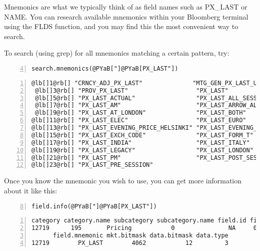 \documentclass[a4paper]{article}
\begin{document}
Mnemonics are what we typically think of as field names such as PX\_LAST or NAME. You can research available mnemonics within your Bloomberg terminal using the FLDS function, and you may find this the most convenient way to search.

To search (using grep) for all mnemonics matching a certain pattern, try:

\begin{Verbatim}[commandchars=@\[\],numbers=left,firstnumber=4,stepnumber=1]
search.mnemonics(@PYaB["]@PYaB[PX_LAST"])
\end{Verbatim}

    

\begin{Verbatim}[commandchars=@\[\],numbers=left,firstnumber=1,stepnumber=1]
 @lb[]1@rb[] "CRNCY_ADJ_PX_LAST"              "MTG_GEN_PX_LAST_UPDATE"        
 @lb[]3@rb[] "PROV_PX_LAST"                   "PX_LAST"                       
 @lb[]5@rb[] "PX_LAST_ACTUAL"                 "PX_LAST_ALL_SESSIONS"          
 @lb[]7@rb[] "PX_LAST_AM"                     "PX_LAST_ARROW_ALL_SESSION"     
 @lb[]9@rb[] "PX_LAST_AT_LONDON"              "PX_LAST_BOTH"                  
@lb[]11@rb[] "PX_LAST_ELEC"                   "PX_LAST_EURO"                  
@lb[]13@rb[] "PX_LAST_EVENING_PRICE_HELSINKI" "PX_LAST_EVENING_TRADE_HELSINKI"
@lb[]15@rb[] "PX_LAST_EXCH_CODE"              "PX_LAST_FORM_T"                
@lb[]17@rb[] "PX_LAST_INDIA"                  "PX_LAST_ITALY"                 
@lb[]19@rb[] "PX_LAST_LEGACY"                 "PX_LAST_LONDON"                
@lb[]21@rb[] "PX_LAST_PM"                     "PX_LAST_POST_SESSION"          
@lb[]23@rb[] "PX_LAST_PRE_SESSION"           
\end{Verbatim}

    

Once you know the mnemonic you wish to use, you can get more information about it like this:

\begin{Verbatim}[commandchars=@\[\],numbers=left,firstnumber=8,stepnumber=1]
field.info(@PYaB["]@PYaB[PX_LAST"])
\end{Verbatim}

    

\begin{Verbatim}[commandchars=@\[\],numbers=left,firstnumber=1,stepnumber=1]
      category category.name subcategory subcategory.name field.id field.name
12719      195       Pricing           0               NA     0560 Last Price
      field.mnemonic mkt.bitmask data.bitmask data.type
12719        PX_LAST        4062           12         3
\end{Verbatim}
\end{document}
